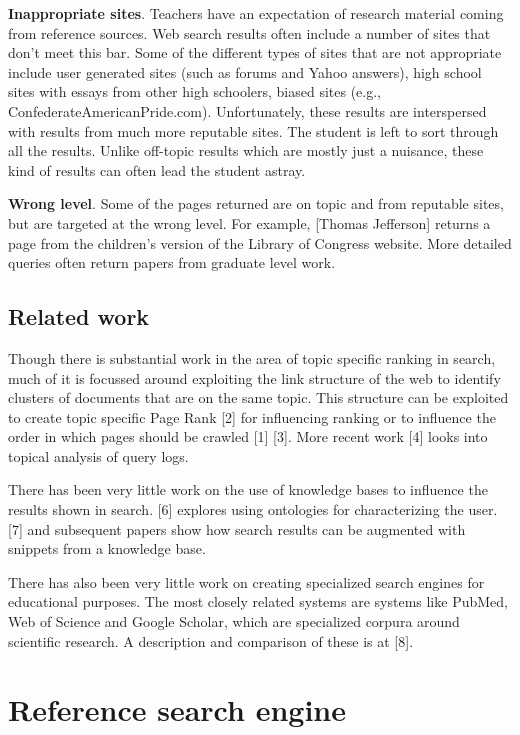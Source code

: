 \documentclass{acm_proc_article-sp}
\begin{document}
{\bf Inappropriate sites}. Teachers have an expectation of research material
coming from reference sources. Web search results often include a number of
sites that don’t meet this bar. Some of the different types of sites that are
not appropriate include user generated sites (such as forums and Yahoo answers),
high school sites with essays from other high schoolers, biased sites (e.g.,
ConfederateAmericanPride.com). Unfortunately, these results are interspersed
with results from much more reputable sites. The student is left to sort through
all the results. Unlike off-topic results which are mostly just a nuisance,
these kind of results can often lead the student astray. 

{\bf Wrong level}. Some of the pages returned are on topic and from reputable
sites, but are targeted at the wrong level. For example, [Thomas Jefferson]
returns a page from the children’s version of the Library of Congress
website. More detailed queries often return papers from graduate level work. 

\subsection{Related work}

 Though there is substantial work in the area of topic specific ranking in
 search, much of it is focussed around exploiting the link structure of the web
 to identify clusters of documents that are on the same topic. This structure
 can be exploited to create topic specific Page Rank [2] for influencing ranking
 or to influence the order in which pages should be crawled [1] [3]. More recent
 work [4] looks into topical analysis of query logs. 

 There has been very little work on the use of knowledge bases to influence the
 results shown in search. [6] explores using ontologies for characterizing the 
user. [7] and subsequent papers show how search results can be augmented with
snippets from a knowledge base.  

There has also been very little work on creating specialized search
engines for educational purposes. The most closely related systems are systems
like PubMed, Web of Science and Google Scholar, which are specialized 
corpura around scientific research. A description and comparison of 
these is at [8].   

\section{Reference search engine}
\end{document}
